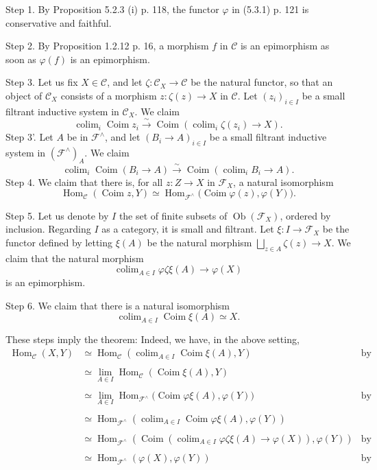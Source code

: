 \documentclass[12pt]{article}
\theoremstyle{remark}%
\newcommand{\n}{\noindent}
\newcommand{\C}{\mathcal C}
\newcommand{\F}{\mathcal F}
\newcommand{\p}{\varphi}
\DeclareMathOperator*{\coli}{colim}
\DeclareMathOperator{\Coim}{Coim}
\DeclareMathOperator{\Hom}{Hom}
\DeclareMathOperator{\Ob}{Ob}
\begin{document}
\n Step 1. By Proposition 5.2.3 (i) p. 118, the functor $\p$ in (5.3.1) p. 121 is conservative and faithful.

\n Step 2. By Proposition 1.2.12 p. 16, a morphism $f$ in $\C$ is an epimorphism as soon as $\p(f)$ is an epimorphism.

\n Step 3. Let us fix $X\in\C$, and let $\zeta:\C_X\to\C$ be the natural functor, so that an object of $\C_X$ consists of a morphism $z:\zeta(z)\to X$ in $\C$. Let $(z_i)_{i\in I}$ be a small filtrant inductive system in $\C_X$. We claim 
$$
\coli_i\Coim z_i\xrightarrow{\sim}
\Coim\left(\coli_i\zeta(z_i)\to X\right).
$$
\n Step 3'. Let $A$ be in $\F^\wedge$, and let $(B_i\to A)_{i\in I}$ be a small filtrant inductive system in $(\F^\wedge)_A$. We claim 
$$
\coli_i\Coim(B_i\to A)\xrightarrow{\sim}
\Coim\left(\coli_iB_i\to A\right).
$$
Step 4. We claim that there is, for all $z:Z\to X$ in $\F_X$, a natural isomorphism 
$$\Hom_\C(\Coim z,Y)\simeq\Hom_{\F^\wedge}\Big(\Coim\p(z),\p(Y)\Big).
$$ 

\n Step 5. Let us denote by $I$ the set of finite subsets of $\Ob(\F_X)$, ordered by inclusion. Regarding $I$ as a category, it is small and filtrant. Let $\xi:I\to\F_X$ be the functor defined by letting $\xi(A)$ be the natural morphism $\bigsqcup_{z\in A}\zeta(z)\to X$. We claim that the natural morphism 
$$
\coli_{A\in I}\p\zeta\xi(A)\to\p(X) 
$$ 
is an epimorphism.

\n Step 6. We claim that there is a natural isomorphism 
$$
\coli_{A\in I}\Coim\xi(A)\simeq X. 
$$

These steps imply the theorem: Indeed, we have, in the above setting, 
%
\begin{align*} 
%
\Hom_\C(X,Y)&\simeq\Hom_\C\left(\coli_{A\in I}\Coim\xi(A),Y\right)&\text{by Step 6}\\ \\ 
%
&\simeq\lim_{A\in I}\Hom_\C(\Coim\xi(A),Y)\\ \\ 
% 
&\simeq\lim_{A\in I}\Hom_{\F^\wedge}\Big(\Coim\p\xi(A),\p(Y)\Big)&\text{by Step 4}\\ \\ 
%
&\simeq\Hom_{\F^\wedge}\left(\coli_{A\in I}\Coim\p\xi(A),\p(Y)\right)\\ \\ 
%
&\simeq\Hom_{\F^\wedge}\left(\Coim\left(\coli_{A\in I}\p\zeta\xi(A)\to\p(X)\right),\p(Y)\right)&\text{by Step 3'}\\ \\ 
%
&\simeq\Hom_{\F^\wedge}(\p(X),\p(Y))&\text{by Step 5.}
%
\end{align*} 
%
\end{document}
